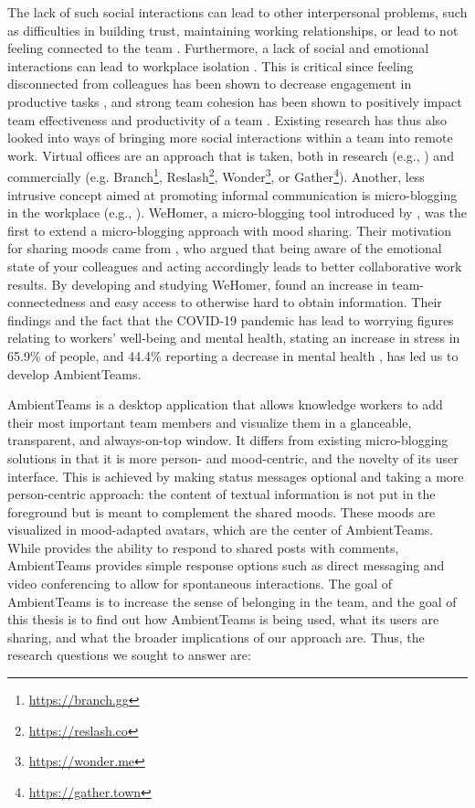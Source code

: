 The lack of such social interactions can lead to other interpersonal problems, such as difficulties in building trust, maintaining working relationships, or lead to not feeling connected to the team \autocite{comella2020revisiting, olson2006bridging}. Furthermore, a lack of social and emotional interactions can lead to workplace isolation \autocite{marshall2007workplace, gorlick2020productivity, mulki2009set}. This is critical since feeling disconnected from colleagues has been shown to decrease engagement in productive tasks \autocite{lostFocus2020}, and strong team cohesion has been shown to positively impact team effectiveness and productivity of a team \autocite{carlson2017virtual}. Existing research has thus also looked into ways of bringing more social interactions within a team into remote work. Virtual offices are an approach that is taken, both in research (e.g., \autocite{sasaki1999video, lou2012presencescape}) and commercially (e.g. Branch\footnote{\url{https://branch.gg}}, Reslash\footnote{\url{https://reslash.co}}, Wonder\footnote{\url{https://wonder.me}}, or Gather\footnote{\url{https://gather.town}}). Another, less intrusive concept aimed at promoting informal communication is micro-blogging in the workplace (e.g., \autocite{ebner2008microblogging, ehrlich2010microblogging, zhang2010case, dullemond2013fixing}). WeHomer, a micro-blogging tool introduced by \textcite{dullemond2013fixing}, was the first to extend a micro-blogging approach with mood sharing. Their motivation for sharing moods came from \textcite{garcia1999emotional}, who argued that being aware of the emotional state of your colleagues and acting accordingly leads to better collaborative work results. By developing and studying WeHomer, \textcite{dullemond2013fixing} found an increase in team-connectedness and easy access to otherwise hard to obtain information. Their findings and the fact that the COVID-19 pandemic has lead to worrying figures relating to workers' well-being and mental health, stating an increase in stress in 65.9\% of people, and 44.4\% reporting a decrease in mental health \autocite{mswellbeing}, has led us to develop AmbientTeams.

AmbientTeams is a desktop application that allows knowledge workers to add their most important team members and visualize them in a glanceable, transparent, and always-on-top window. It differs from existing micro-blogging solutions in that it is more person- and mood-centric, and the novelty of its user interface. This is achieved by making status messages optional and taking a more person-centric approach: the content of textual information is not put in the foreground but is meant to complement the shared moods. These moods are visualized in mood-adapted avatars, which are the center of AmbientTeams. While \textcite{dullemond2013fixing} provides the ability to respond to shared posts with comments, AmbientTeams provides simple response options such as direct messaging and video conferencing to allow for spontaneous interactions. The goal of AmbientTeams is to increase the sense of belonging in the team, and the goal of this thesis is to find out how AmbientTeams is being used, what its users are sharing, and what the broader implications of our approach are. Thus, the research questions we sought to answer are:

